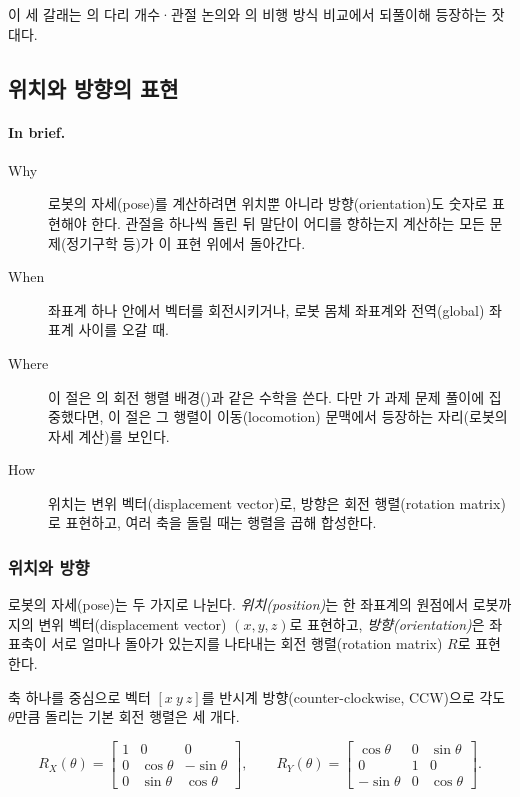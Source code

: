 이 세 갈래는 의 다리 개수·관절 논의와
의 비행 방식 비교에서 되풀이해 등장하는 잣대다.

\subsection{위치와 방향의 표현}
\label{sec:lec02-rotation}

\paragraph{In brief.}
\begin{description}
  \item[Why] 로봇의 자세(pose)를 계산하려면 위치뿐 아니라 방향(orientation)도
        숫자로 표현해야 한다. 관절을 하나씩 돌린 뒤 말단이 어디를 향하는지
        계산하는 모든 문제(정기구학 등)가 이 표현 위에서 돌아간다.
  \item[When] 좌표계 하나 안에서 벡터를 회전시키거나, 로봇 몸체 좌표계와
        전역(global) 좌표계 사이를 오갈 때.
  \item[Where] 이 절은 의 회전 행렬 배경()과
        같은 수학을 쓴다. 다만 가 과제 문제 풀이에 집중했다면, 이
        절은 그 행렬이 이동(locomotion) 문맥에서 등장하는 자리(로봇의 자세
        계산)를 보인다.
  \item[How] 위치는 변위 벡터(displacement vector)로, 방향은 회전
        행렬(rotation matrix)로 표현하고, 여러 축을 돌릴 때는 행렬을 곱해
        합성한다.
\end{description}

\subsubsection{위치와 방향}
\label{sec:lec02-rotation-basic}

로봇의 자세(pose)는 두 가지로 나뉜다. \emph{위치(position)}는 한 좌표계의
원점에서 로봇까지의 변위 벡터(displacement vector) $(x, y, z)$로 표현하고,
\emph{방향(orientation)}은 좌표축이 서로 얼마나 돌아가 있는지를 나타내는 회전
행렬(rotation matrix) $R$로 표현한다.

축 하나를 중심으로 벡터 $[x\ y\ z]$를 반시계 방향(counter-clockwise, CCW)으로
각도 $\theta$만큼 돌리는 기본 회전 행렬은 세 개다.

\begin{equation}
\label{eq:lec02-rx}
R_X(\theta) =
\begin{bmatrix}
1 & 0 & 0 \\
0 & \cos\theta & -\sin\theta \\
0 & \sin\theta & \cos\theta
\end{bmatrix},
\qquad
R_Y(\theta) =
\begin{bmatrix}
\cos\theta & 0 & \sin\theta \\
0 & 1 & 0 \\
-\sin\theta & 0 & \cos\theta
\end{bmatrix}.
\end{equation}

